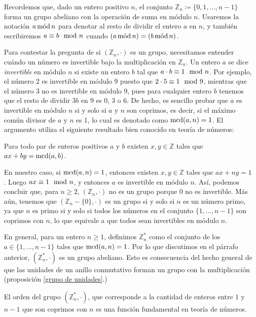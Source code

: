 Recordemos que, dado un entero positivo $n$, el conjunto $\mathbb{Z}_n \coloneq \{0, 1, \dots, n-1\}$ forma un grupo abeliano con la operación de suma en módulo $n$. Usaremos la notación $a \mods n$ para denotar al resto de dividir el entero $a$ en $n$, y también escribiremos $a \equiv b \modl n$ cuando $(a \mods n) = (b \mods n)$.

Para contestar la pregunta de si $(\mathbb{Z}_n, \cdot)$ es un grupo, necesitamos entender cuándo un número es invertible bajo la multiplicación en $\mathbb{Z}_n$. Un entero $a$ se dice \emph{invertible} en módulo $n$ si existe un entero $b$ tal que $a \cdot b \equiv 1 \modl n$. Por ejemplo, el número 2 es invertible en módulo 9
puesto que $2 \cdot 5 \equiv 1 \modl 9$, mientras que el número 3 no es invertible en módulo 9, pues para cualquier entero $b$ tenemos que el resto de dividir $3b$ en $9$ es $0$, $3$ o $6$. De hecho, es sencillo probar que $a$ es
invertible en módulo $n$ si y solo si $a$ y $n$ son coprimos, es decir, si el máximo común divisor de $a$ y $n$ es 1, lo cual es denotado como $\MCD(a,n) = 1$. El argumento utiliza el siguiente resultado bien conocido en teoría de números:

\begin{prop} \label{bezout}
Para todo par de enteros positivos $a$ y $b$ existen $x, y \in \mathbb{Z}$ tales que $ax+by = \MCD(a, b)$.
\end{prop}

En nuestro caso, si $\MCD(a, n) = 1$, entonces existen $x, y \in \mathbb{Z}$ tales que $ax+ny = 1$. Luego $ax \equiv 1 \modl n$, y entonces $a$ es invertible en módulo $n$.
Así, podemos concluir que, para $n \geq 2$,
$(\mathbb{Z}_n, \cdot)$ no es un grupo porque $0$ no es
invertible. Más aún, tenemos que $(\mathbb{Z}_n - \{0\},
\cdot)$ es un grupo si y solo si $n$ es un número primo, ya que $n$ es primo si y solo si todos los números en el conjunto $\{1, \ldots,
n-1\}$ son coprimos con $n$, lo que equivale a que todos sean invertibles en módulo $n$.

En general, para un entero $n \geq 1$, definimos $\mathbb{Z}_n^*$ como el conjunto de los $a \in \{1, \dots, n-1\}$ tales que $\MCD(a, n) = 1$. Por lo que discutimos en el párrafo anterior, $(\mathbb{Z}_n^*, \cdot)$ es un grupo abeliano. Esto es consecuencia del hecho general de que las unidades de un anillo conmutativo forman un grupo con la multiplicación (proposición \ref{grupo de unidades}.)

El orden del grupo $(\mathbb{Z}_n^*, \cdot)$, que corresponde a la cantidad de enteros entre $1$ y $n-1$ que son coprimos con $n$ es una función fundamental en teoría de números.

